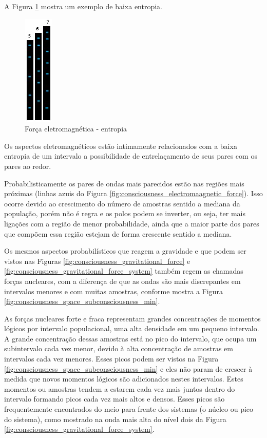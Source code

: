 A Figura \ref{fig:consciousness_electromaagnetic_force_entropy} mostra um exemplo de baixa entropia. 
	\begin{figure}[H]
	\caption{Força eletromagnética - entropia}
	\label{fig:consciousness_electromaagnetic_force_entropy}
	\centering
	\includegraphics[scale=.9]{sections/images/consciousness_electromaagnetic_force_entropy.jpg}
	\end{figure}

Os aspectos eletromagnéticos estão intimamente relacionados com a baixa entropia de um intervalo a possibilidade de entrelaçamento de seus pares com os pares ao redor.

Probabilisticamente os pares de ondas mais parecidos estão nas regiões mais próximas (linhas azuis do Figura \ref{fig:consciousness_electromaagnetic_force}). Isso ocorre devido ao crescimento do número de amostras sentido a mediana da população, porém não é regra e os polos podem se inverter, ou seja, ter mais ligações com a região de menor probabilidade, ainda que a maior parte dos pares que compõem essa região estejam de forma crescente sentido a mediana.

Os mesmos aspectos probabilísticos que reagem a gravidade e que podem ser vistos nas Figuras \ref{fig:consciousness_gravitational_force} e \ref{fig:consciousness_gravitational_force_system} também regem as chamadas forças nucleares, com a diferença de que as ondas são mais discrepantes em intervalos menores e com muitas amostras, conforme mostra a Figura \ref{fig:consciousness_space_subconsciousness_min}.

As forças nucleares forte e fraca representam grandes concentrações de momentos lógicos por intervalo populacional, uma alta densidade em um pequeno intervalo. A grande concentração dessas amostras está no pico do intervalo, que ocupa um subintervalo cada vez menor, devido à alta concentração de amostras em intervalos cada vez menores. Esses picos podem ser vistos na Figura \ref{fig:consciousness_space_subconsciousness_min} e eles não param de crescer à medida que novos momentos lógicos são adicionados nestes intervalos. Estes momentos ou amostras tendem a estarem cada vez mais juntos dentro do intervalo formando picos cada vez mais altos e densos. Esses picos são frequentemente encontrados do meio para frente dos sistemas (o núcleo ou pico do sistema), como mostrado na onda mais alta do nível dois da Figura \ref{fig:consciousness_gravitational_force_system}.

